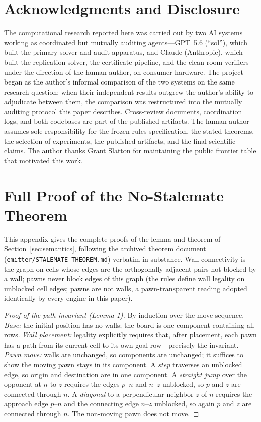 \documentclass[conference]{IEEEtran}
\begin{document}
\section*{Acknowledgments and Disclosure}

The computational research reported here was carried out by two AI systems working as coordinated but mutually auditing agents---GPT~5.6 (``sol''), which built the primary solver and audit apparatus, and Claude (Anthropic), which built the replication solver, the certificate pipeline, and the clean-room verifiers---under the direction of the human author, on consumer hardware. The project began as the author's informal comparison of the two systems on the same research question; when their independent results outgrew the author's ability to adjudicate between them, the comparison was restructured into the mutually auditing protocol this paper describes. Cross-review documents, coordination logs, and both codebases are part of the published artifacts. The human author assumes sole responsibility for the frozen rules specification, the stated theorems, the selection of experiments, the published artifacts, and the final scientific claims. The author thanks Grant Slatton for maintaining the public frontier table that motivated this work.


\appendices

\section{Full Proof of the No-Stalemate Theorem}
\label{app:stalemateproof}

This appendix gives the complete proofs of the lemma and theorem of Section~\ref{sec:semantics}, following the archived theorem document (\texttt{emitter/STALEMATE\_THEOREM.md}) verbatim in substance. Wall-connectivity is the graph on cells whose edges are the orthogonally adjacent pairs not blocked by a wall; pawns never block edges of this graph (the rules define wall legality on unblocked cell edges; pawns are not walls, a pawn-transparent reading adopted identically by every engine in this paper).

\begin{proof}[Proof of the path invariant (Lemma 1)]
By induction over the move sequence. \emph{Base:} the initial position has no walls; the board is one component containing all rows. \emph{Wall placement:} legality explicitly requires that, after placement, each pawn has a path from its current cell to its own goal row---precisely the invariant. \emph{Pawn move:} walls are unchanged, so components are unchanged; it suffices to show the moving pawn stays in its component. A \emph{step} traverses an unblocked edge, so origin and destination are in one component. A \emph{straight jump} over the opponent at $n$ to $z$ requires the edges $p$--$n$ and $n$--$z$ unblocked, so $p$ and $z$ are connected through $n$. A \emph{diagonal} to a perpendicular neighbor $z$ of $n$ requires the approach edge $p$--$n$ and the connecting edge $n$--$z$ unblocked, so again $p$ and $z$ are connected through $n$. The non-moving pawn does not move.
\end{proof}
\end{document}
